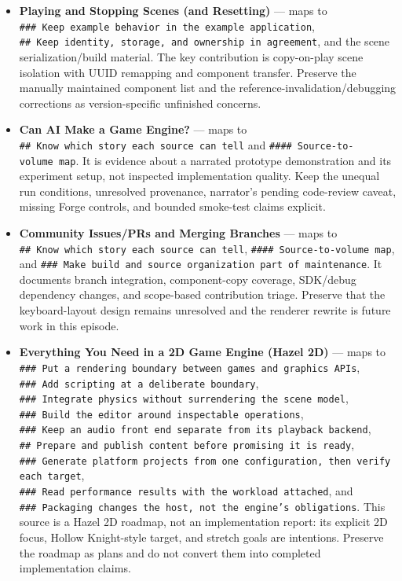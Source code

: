 \begin{itemize}
\item
  \textbf{Playing and Stopping Scenes (and Resetting)} --- maps to \texttt{\#\#\#\ Keep\ example\ behavior\ in\ the\ example\ application}, \texttt{\#\#\ Keep\ identity,\ storage,\ and\ ownership\ in\ agreement}, and the scene serialization/build material. The key contribution is copy-on-play scene isolation with UUID remapping and component transfer. Preserve the manually maintained component list and the reference-invalidation/debugging corrections as version-specific unfinished concerns.
\item
  \textbf{Can AI Make a Game Engine?} --- maps to \texttt{\#\#\ Know\ which\ story\ each\ source\ can\ tell} and \texttt{\#\#\#\#\ Source-to-volume\ map}. It is evidence about a narrated prototype demonstration and its experiment setup, not inspected implementation quality. Keep the unequal run conditions, unresolved provenance, narrator's pending code-review caveat, missing Forge controls, and bounded smoke-test claims explicit.
\item
  \textbf{Community Issues/PRs and Merging Branches} --- maps to \texttt{\#\#\ Know\ which\ story\ each\ source\ can\ tell}, \texttt{\#\#\#\#\ Source-to-volume\ map}, and \texttt{\#\#\#\ Make\ build\ and\ source\ organization\ part\ of\ maintenance}. It documents branch integration, component-copy coverage, SDK/debug dependency changes, and scope-based contribution triage. Preserve that the keyboard-layout design remains unresolved and the renderer rewrite is future work in this episode.
\item
  \textbf{Everything You Need in a 2D Game Engine (Hazel 2D)} --- maps to \texttt{\#\#\#\ Put\ a\ rendering\ boundary\ between\ games\ and\ graphics\ APIs}, \texttt{\#\#\#\ Add\ scripting\ at\ a\ deliberate\ boundary}, \texttt{\#\#\#\ Integrate\ physics\ without\ surrendering\ the\ scene\ model}, \texttt{\#\#\#\ Build\ the\ editor\ around\ inspectable\ operations}, \texttt{\#\#\#\ Keep\ an\ audio\ front\ end\ separate\ from\ its\ playback\ backend}, \texttt{\#\#\ Prepare\ and\ publish\ content\ before\ promising\ it\ is\ ready}, \texttt{\#\#\#\ Generate\ platform\ projects\ from\ one\ configuration,\ then\ verify\ each\ target}, \texttt{\#\#\#\ Read\ performance\ results\ with\ the\ workload\ attached}, and \texttt{\#\#\#\ Packaging\ changes\ the\ host,\ not\ the\ engine’s\ obligations}. This source is a Hazel 2D roadmap, not an implementation report: its explicit 2D focus, Hollow Knight-style target, and stretch goals are intentions. Preserve the roadmap as plans and do not convert them into completed implementation claims.

\end{itemize}
